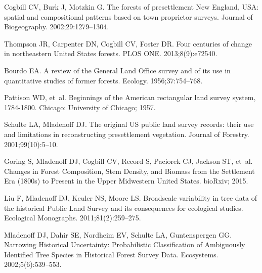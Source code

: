 \documentclass[10pt,letterpaper]{article}
\begin{document}
\nolinenumbers

%
%
% 

\begin{thebibliography}{10}

Cogbill CV, Burk J, Motzkin G.
\newblock The forests of presettlement {N}ew {E}ngland, {USA}: spatial and
  compositional patterns based on town proprietor surveys.
\newblock Journal of Biogeography. 2002;29:1279--1304.

Thompson JR, Carpenter DN, Cogbill CV, Foster DR.
\newblock Four centuries of change in northeastern {United States} forests.
\newblock PLOS ONE. 2013;8(9):e72540.

Bourdo EA.
\newblock A review of the General Land Office survey and of its use in
  quantitative studies of former forests.
\newblock Ecology. 1956;37:754--768.

Pattison WD, et~al.
\newblock Beginnings of the American rectangular land survey system, 1784-1800.
\newblock Chicago: University of Chicago; 1957.

Schulte LA, Mladenoff DJ.
\newblock The original {US} public land survey records: their use and
  limitations in reconstructing presettlement vegetation.
\newblock Journal of Forestry. 2001;99(10):5--10.

Goring S, Mladenoff DJ, Cogbill CV, Record S, Paciorek CJ, Jackson ST, et~al.
\newblock Changes in Forest Composition, Stem Density, and Biomass from the
  Settlement Era (1800s) to Present in the Upper Midwestern United States.
\newblock bioRxiv; 2015.

Liu F, Mladenoff DJ, Keuler NS, Moore LS.
\newblock Broadscale variability in tree data of the historical Public Land
  Survey and its consequences for ecological studies.
\newblock Ecological Monographs. 2011;81(2):259--275.

Mladenoff DJ, Dahir SE, Nordheim EV, Schulte LA, Guntenspergen GG.
\newblock Narrowing Historical Uncertainty: Probabilistic Classification of
  Ambiguously Identified Tree Species in Historical Forest Survey Data.
\newblock Ecosystems. 2002;5(6):539--553.


\end{thebibliography}
\end{document}
